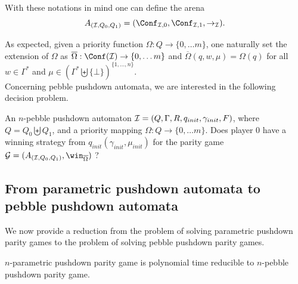 With these notations in mind one can  define the arena
$$
A_{(\ppda, Q_0 , Q_1)}
=
(\Conf_{\ppda,0}, \Conf_{\ppda,1}, \rightarrow_{\ppda}).$$




As expected, given a 
priority function $\Omega: Q \to \{0, \ldots m\}$,
one naturally 
set the extension of $\Omega$ as
$\overline{\Omega}: \Conf(\ppda) \to \{0, \ldots m\}$
and
$\overline{\Omega}(q, w,\mu) = \Omega(q)$
for all
$w \in  \Gamma^*$
and
$\mu \in ( \Gamma^* \biguplus \{ \bot \})^{\{1, \ldots, n\}}$. \\









Concerning pebble pushdown automata, we are interested in the following decision problem.


{An $n$-pebble pushdown automaton $\mathcal{I}= (Q, \Gamma,  R, q_{init}, {\gamma_{init}} , F)$, 
where $Q = Q_0  \biguplus Q_1 $, 
and
a priority mapping $\Omega: Q \to \{0, \ldots m\}$.}
{Does player $0$ have a winning strategy from $q_{init}(\gamma_{init}, \mu_{init})$ for the parity game 
$\mathcal{G}= (A_{(\ppda, Q_0 , Q_1)}, \win_{\overline{\Omega}})$ ?\newline}



\subsection{From parametric pushdown 
automata 
to pebble pushdown automata
}

We now provide a reduction from the problem of solving parametric pushdown parity games to the problem of solving pebble pushdown parity games. 


\begin{theorem}\label{PPDA reduction}
{\sc $n$-parametric pushdown parity game} 
is polynomial time reducible to
{\sc $n$-pebble pushdown parity game}.
\end{theorem}




